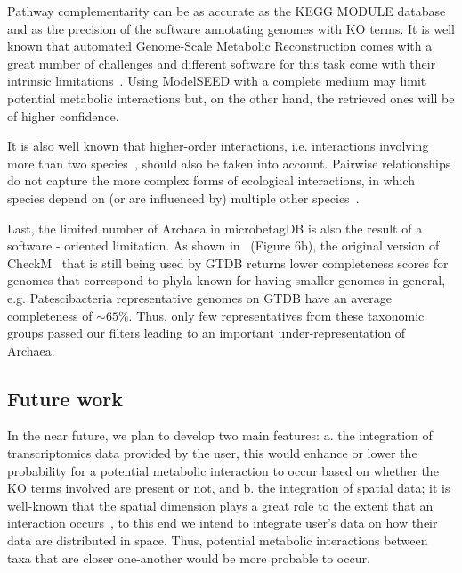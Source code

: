 \documentclass[sn-mathphys,Numbered]{sn-jnl}  %
\theoremstyle{thmstyleone}%
\theoremstyle{thmstyletwo}%
\theoremstyle{thmstylethree}%
\begin{document}
        Pathway complementarity can be as accurate as the KEGG MODULE database and as the precision of the software annotating genomes with KO terms.
        It is well known that automated Genome-Scale Metabolic Reconstruction comes with a great number of challenges and different software for this task come with their intrinsic limitations~\cite{mendoza2019systematic}. 
        Using ModelSEED with a complete medium may limit potential metabolic interactions but, on the other hand, the retrieved ones will be of higher confidence.

        It is also well known that higher-order interactions, i.e. interactions involving more than two species~\cite{zelezniak2015metabolic}, should also be taken into account. 
        Pairwise relationships do not capture the more complex forms of ecological interactions, in which species depend on (or are influenced by) multiple other species~\cite{faust2012microbialReviewInteractions}.

        Last, the limited number of Archaea in microbetagDB is also the result of a software - oriented limitation.
        As shown in~\cite{chklovski2023checkm2} (Figure 6b), the original version of CheckM~\cite{parks2015checkm} that is still being used by GTDB returns lower completeness scores for genomes that correspond to phyla known for having smaller genomes in general, 
        e.g. Patescibacteria representative genomes on GTDB have an average completeness of $\sim 65\%$.
        Thus, only few representatives from these taxonomic groups passed our filters leading to an important under-representation of Archaea.


    \subsection*{Future work}
    \label{subsec:future}

        In the near future, we plan to develop two main features: 
        a. the integration of transcriptomics data provided by the user, this would enhance or lower the probability for a potential metabolic interaction to occur based on whether the KO terms involved are present or not, and 
        b. the integration of spatial data; it is well-known that the spatial dimension plays a great role to the extent that an interaction occurs~\cite{dal2020short}, to this end we intend to integrate user's data on how their data are distributed in space. 
        Thus, potential metabolic interactions between taxa that are closer one-another would be more probable to occur.
\end{document}
